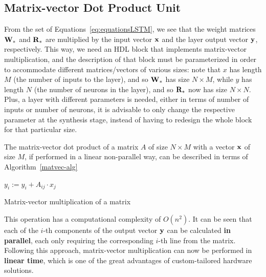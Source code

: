 \subsection{Matrix-vector Dot Product Unit}\label{sec:dotprod_sec}
From the set of Equations~\ref{eq:equationsLSTM}, we see that the weight matrices $\mathbf{W}_*$ and $\mathbf{R}_*$ are multiplied by the input
vector $\mathbf{x}$ and the layer output vector $\mathbf{y}$, respectively. This way, we need an HDL block that implements matrix-vector multiplication,
and the description of that block must be parameterized in order to accommodate different matrices/vectors of various sizes: note that $x$ has length $M$ (the number
of inputs to the layer), and so $\mathbf{W}_*$ has size $N\times M$, while $y$ has length $N$ (the number of neurons in the layer), and so $\mathbf{R}_*$
now has size $N\times N$. Plus, a layer with different parameters is needed, either in terms of number of inputs or number of neurons, it is advisable
to only change the respective parameter at the synthesis stage, instead of having to redesign the whole block for that particular size.

The matrix-vector dot product of a matrix $A$ of size $N \times M$ with a vector $\mathbf{x}$ of size $M$, if performed in a linear non-parallel way, can be described in terms of Algorithm~\ref{matvec-alg}

\begin{algorithm}
\begin{algorithmic}
    \State $y_i := y_i + A_{ij} \cdot x_j$
    \EndFor
\EndFor
\end{algorithmic}
\caption{Matrix-vector multiplication of a matrix}
\label{matvec-alg}
\end{algorithm}
This operation has a computational complexity of $O(n^2)$. It can be seen that each of the $i$-th components of the output vector $\mathbf{y}$ can be calculated \textbf{in parallel},
each only requiring the corresponding $i$-th line from the matrix. Following this approach, matrix-vector multiplication can now be performed in \textbf{linear time}, which
is one of the great advantages of custom-tailored hardware solutions.

